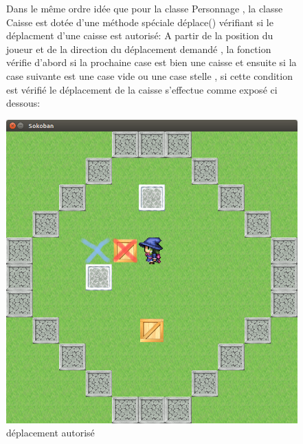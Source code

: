 \documentclass{article}
\begin{document}
				
				
				
	\begin{figure}		
	
Dans le même ordre idée que pour la classe Personnage , la classe Caisse est dotée d'une méthode spéciale déplace() vérifiant si le déplacment d'une caisse est autorisé:
 A partir de la position du joueur et de la direction du déplacement demandé , la fonction vérifie d'abord si la prochaine case est bien une caisse et ensuite si la case suivante est une case vide ou une case stelle , si cette condition est vérifié le déplacement de la caisse s'effectue comme exposé ci dessous:

	\begin{center}
	\begin{minipage}[b]{0.4\textwidth}
    \includegraphics[width=\textwidth]{../Screenshots/02.png}
    \caption{déplacement autorisé}
  \end{minipage}
  \hfill
  \begin{minipage}[b]{0.4\textwidth}

\end{minipage}
\end{center}
\end{figure}
\end{document}
